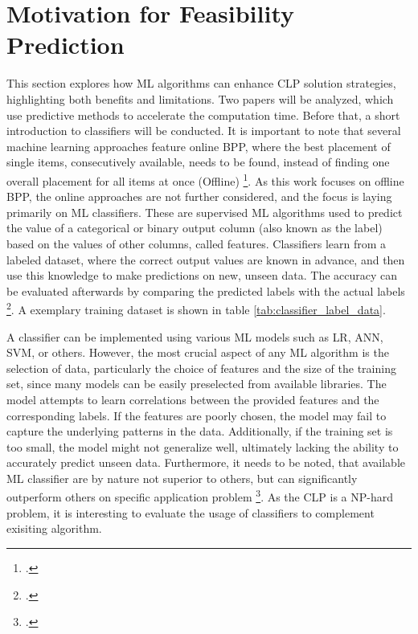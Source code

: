 \chapter{Motivation for Feasibility Prediction}
\label{sec:motivation_feasibility_prediction}
This section explores how \gls{ML} algorithms can enhance \gls{CLP} solution strategies,
highlighting both benefits and limitations. Two papers will be
analyzed, which use predictive methods to accelerate the computation time. Before that,
a short introduction to classifiers will be conducted. It is important to note that
several machine learning approaches feature
online \gls{BPP}, where the best placement of single items, consecutively available,
needs to be found, instead of finding one overall placement for all items at once
(Offline) \footcite[cf.][p. 1]{ali_-line_2022}. As this work focuses on offline
\gls{BPP}, the online approaches are not further considered, and the focus is laying
primarily on \gls{ML} classifiers. These are supervised \gls{ML} algorithms used to predict the
value of a categorical or binary output column (also known as the label) based on the
values of other columns, called features. Classifiers learn from a labeled dataset,
where the correct output values are known in advance, and then use this knowledge to
make predictions on new, unseen data. The accuracy can be evaluated afterwards by comparing
the predicted labels with the actual labels \footcite[cf.][]{kotsiantis_supervised_2007}.
A exemplary training dataset is shown in table \ref{tab:classifier_label_data}.



A classifier can be implemented using various \gls{ML} models such as \gls{LR},
\gls{ANN}, \gls{SVM}, or others. However, the most crucial aspect of any
\gls{ML} algorithm is the selection of data, particularly the choice of features and
the size of the training set, since many models can be easily preselected from available
libraries. The model attempts to learn correlations between the provided features
and the corresponding labels. If the features are poorly chosen, the model may fail
to capture the underlying patterns in the data. Additionally, if the training set
is too small, the model might not generalize well, ultimately lacking the ability
to accurately predict unseen data. Furthermore, it needs to be noted, that available
\gls{ML} classifier are by nature not superior to others, but can significantly outperform
others on specific application problem \footcite[cf.][pp. 250, 264]{kotsiantis_supervised_2007}.
As the \gls{CLP} is a NP-hard problem, it is interesting to evaluate the usage of classifiers
to complement exisiting algorithm.

